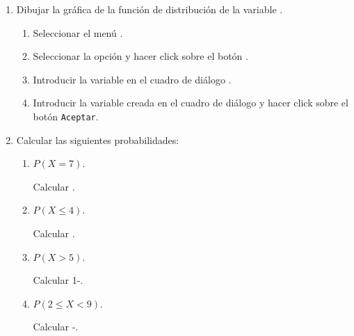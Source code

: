 \begin{enumerate}[leftmargin=*]
\begin{enumerate}
\item Dibujar la gráfica de la función de distribución de la
variable .

\begin{indicacion}
\begin{enumerate}

\item Seleccionar el menú .

\item Seleccionar la opción  y hacer click sobre el
botón .

\item Introducir la variable  en el cuadro de diálogo
.

\item Introducir la variable creada  en el
cuadro de diálogo  y hacer click sobre el botón
\texttt{Aceptar}.

\end{enumerate}
\end{indicacion}


\item Calcular las siguientes probabilidades:
\begin{enumerate}
\item $P(X=7)$.

\begin{indicacion}
Calcular .
\end{indicacion}

\item $P(X\leq 4)$.

\begin{indicacion}
Calcular .
\end{indicacion}

\item $P(X>5)$.

\begin{indicacion}
Calcular 1-.
\end{indicacion}

\item $P(2\leq X < 9)$.

\begin{indicacion}
Calcular
-.
\end{indicacion}

\end{enumerate}


\end{enumerate}
\end{enumerate}
